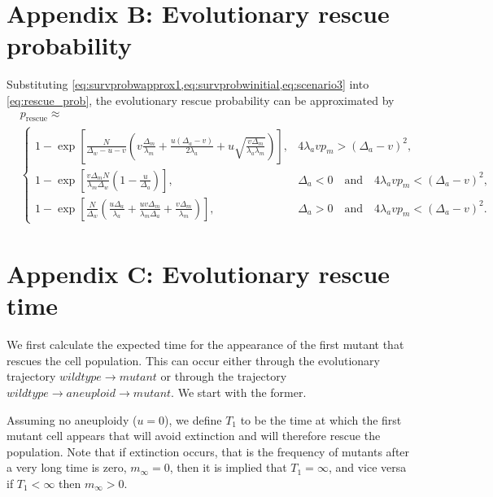 \documentclass[12pt]{extarticle}
\newcommand{\presc}{p_\text{rescue}}
\begin{document}
\begin{appendices}

\section*{Appendix B: Evolutionary rescue probability}\label{sec:appendix-rescue-prob}

Substituting \cref{eq:survprobwapprox1,eq:survprobwinitial,eq:scenario3} into \cref{eq:rescue_prob}, the evolutionary rescue probability can be approximated by
\begin{equation}\label{rescue_prob_approx}
\begin{aligned}
&\presc \approx \\
  &\begin{cases}
  1-\exp\left[\frac{N}{\Delta_w-u-v}\left(v\frac{\Delta_m}{\lambda_m}+\frac{u\left(\Delta_a-v\right)}{2\lambda_a}+u\sqrt{\frac{v\Delta_m}{\lambda_a\lambda_m}}\right)\right] ,&
  4\lambda_avp_m>\left(\Delta_a-v\right)^2 ,\\
   1-\exp\left[\frac{v\Delta_mN}{\lambda_m\Delta_w}\left(1-\frac{u}{\Delta_a}\right)\right] ,&
   \Delta_a<0\quad\text{and}\quad4\lambda_avp_m<\left(\Delta_a-v\right)^2 ,\\
   1-\exp\left[\frac{N}{\Delta_w}\left(\frac{u\Delta_a}{\lambda_a}+\frac{uv\Delta_m}{\lambda_m\Delta_a}+\frac{v\Delta_m}{\lambda_m}\right)\right] ,&
   \Delta_a>0\quad\text{and}\quad4\lambda_avp_m<\left(\Delta_a-v\right)^2 .
  \end{cases}
\end{aligned}
\end{equation}


\section*{Appendix C: Evolutionary rescue time}

We first calculate the expected time for the appearance of the first mutant that rescues the cell population.
This can occur either through the evolutionary trajectory $wildtype \rightarrow mutant$ or through the trajectory $wildtype \rightarrow aneuploid \rightarrow mutant$.
We start with the former. 

Assuming no aneuploidy ($u=0$), we define $T_1$ to be the time at which the first mutant cell appears that will avoid extinction and will therefore rescue the population.
Note that if extinction occurs, that is the frequency of mutants after a very long time is zero, $m_{\infty}=0$, then it is implied that $T_1=\infty$, and vice versa if $T_1<\infty$ then $m_{\infty}>0$.


\end{appendices}
\end{document}
